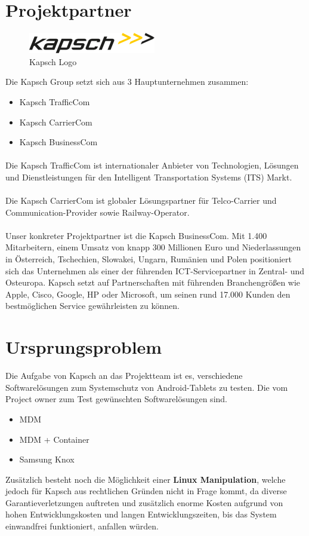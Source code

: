 \newpage

\section{Projektpartner}
\begin{figure}[H]
\includegraphics[scale=1.0]{Images/kapsch_logo}
\caption{Kapsch Logo}
\end{figure}
Die Kapsch Group setzt sich aus 3 Hauptunternehmen zusammen:
\begin{itemize}
	\item Kapsch TrafficCom
	\item Kapsch CarrierCom
	\item Kapsch BusinessCom
\end{itemize}

\paragraph*{}
Die Kapsch TrafficCom ist internationaler Anbieter von Technologien, Lösungen und Dienstleistungen für den Intelligent Transportation Systems (ITS) Markt. 
\paragraph*{}
Die Kapsch CarrierCom ist globaler Lösungspartner für Telco-Carrier und Communication-Provider sowie Railway-Operator. 
\paragraph*{} 
Unser konkreter Projektpartner ist die Kapsch BusinessCom.
Mit 1.400 Mitarbeitern, einem Umsatz von knapp 300 Millionen Euro und Niederlassungen in Österreich, Tschechien, Slowakei, Ungarn, Rumänien und Polen positioniert sich das Unternehmen als einer der führenden ICT-Servicepartner in Zentral- und Osteuropa. Kapsch setzt auf Partnerschaften mit führenden Branchengrößen wie Apple, Cisco, Google, HP oder Microsoft, um seinen rund 17.000 Kunden den bestmöglichen Service gewährleisten zu können.

\newpage

\section{Ursprungsproblem}
Die Aufgabe von Kapsch an das Projektteam ist es, verschiedene Softwarelösungen zum Systemschutz von Android-Tablets zu testen. Die vom Project owner zum Test gewünschten Softwarelösungen sind.
\begin{itemize}
	\item MDM
	\item MDM + Container
	\item Samsung Knox
\end{itemize}
Zusätzlich besteht noch die Möglichkeit einer \textbf {Linux Manipulation}, welche jedoch für Kapsch aus rechtlichen Gründen nicht in Frage kommt, da diverse Garantieverletzungen auftreten und zusätzlich enorme Kosten aufgrund von hohen Entwicklungskosten und langen Entwicklungszeiten, bis das System einwandfrei funktioniert, anfallen würden.
